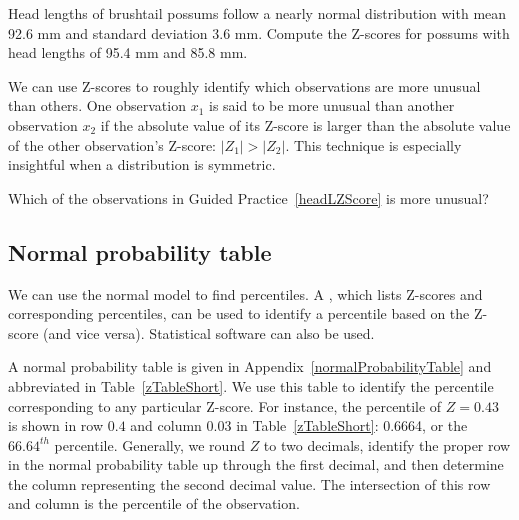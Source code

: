 \begin{exercisewrap}
\begin{nexercise} \label{headLZScore}
Head lengths of brushtail possums follow a nearly normal distribution with mean 92.6 mm and standard deviation 3.6 mm. Compute the Z-scores for possums with head lengths of 95.4 mm and 85.8 mm.\footnotemark
\end{nexercise}
\end{exercisewrap}

We can use Z-scores to roughly identify which observations are more unusual than others. One observation $x_1$ is said to be more unusual than another observation $x_2$ if the absolute value of its Z-score is larger than the absolute value of the other observation's Z-score: $|Z_1| > |Z_2|$. This technique is especially insightful when a distribution is symmetric.

\begin{exercisewrap}
\begin{nexercise}
Which of the observations in Guided Practice~\ref{headLZScore} is more unusual?\footnotemark
\end{nexercise}
\end{exercisewrap}

\subsection{Normal probability table}

We can use the normal model to find percentiles. A , which lists Z-scores and corresponding percentiles, can be used to identify a percentile based on the Z-score (and vice versa). Statistical software can also be used.

A normal probability table is given in Appendix~\vref{normalProbabilityTable} and abbreviated in Table~\ref{zTableShort}. We use this table to identify the percentile corresponding to any particular Z-score. For instance, the percentile of $Z=0.43$ is shown in row $0.4$ and column $0.03$ in Table~\ref{zTableShort}: 0.6664, or the $66.64^{th}$ percentile. Generally, we round $Z$ to two decimals, identify the proper row in the normal probability table up through the first decimal, and then determine the column representing the second decimal value. The intersection of this row and column is the percentile of the observation.

